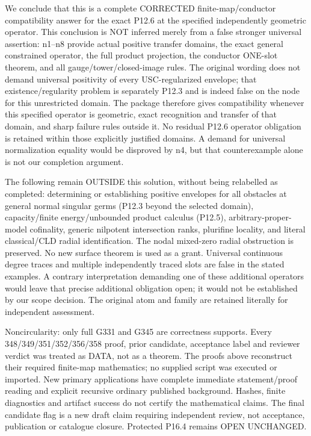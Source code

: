\documentclass[11pt]{article}
\begin{document}
We conclude that this is a complete CORRECTED finite-map/conductor compatibility answer for the exact P12.6 at the specified independently geometric operator. This conclusion is NOT inferred merely from a false stronger universal assertion: n1--n8 provide actual positive transfer domains, the exact general constrained operator, the full product projection, the conductor ONE-slot theorem, and all gauge/tower/closed-image rules. The original wording does not demand universal positivity of every USC-regularized envelope; that existence/regularity problem is separately P12.3 and is indeed false on the node for this unrestricted domain. The package therefore gives compatibility whenever this specified operator is geometric, exact recognition and transfer of that domain, and sharp failure rules outside it. No residual P12.6 operator obligation is retained within those explicitly justified domains. A demand for universal normalization equality would be disproved by n4, but that counterexample alone is not our completion argument.

The following remain OUTSIDE this solution, without being relabelled as completed: determining or establishing positive envelopes for all obstacles at general normal singular germs (P12.3 beyond the selected domain), capacity/finite energy/unbounded product calculus (P12.5), arbitrary-proper-model cofinality, generic nilpotent intersection ranks, plurifine locality, and literal classical/CLD radial identification. The nodal mixed-zero radial obstruction is preserved. No new surface theorem is used as a grant. Universal continuous degree traces and multiple independently traced slots are false in the stated examples. A contrary interpretation demanding one of these additional operators would leave that precise additional obligation open; it would not be established by our scope decision. The original atom and family are retained literally for independent assessment.

Noncircularity: only full G331 and G345 are correctness supports. Every 348/349/351/352/356/358 proof, prior candidate, acceptance label and reviewer verdict was treated as DATA, not as a theorem. The proofs above reconstruct their required finite-map mathematics; no supplied script was executed or imported. New primary applications have complete immediate statement/proof reading and explicit recursive ordinary published background. Hashes, finite diagnostics and artifact success do not certify the mathematical claims. The final candidate flag is a new draft claim requiring independent review, not acceptance, publication or catalogue closure. Protected P16.4 remains OPEN UNCHANGED.
\end{document}
